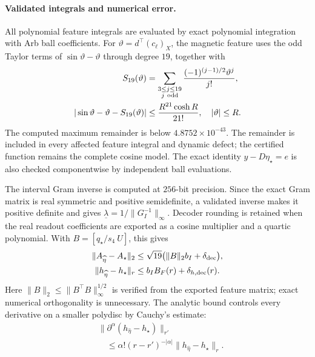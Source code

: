 \paragraph{Validated integrals and numerical error.}
All polynomial feature integrals are evaluated by exact polynomial
integration with Arb ball coefficients. For $\vartheta=d^\top(c_\ell)_X$,
the magnetic feature uses the odd Taylor terms of
$\sin\vartheta-\vartheta$ through degree $19$, together with
\begin{equation}
 \begin{aligned}
 S_{19}(\vartheta)&=
 \sum_{\substack{3\leq j\leq19\\j\ {\rm odd}}}
       \frac{(-1)^{(j-1)/2}\vartheta^j}{j!},\\
 |\sin\vartheta-\vartheta-S_{19}(\vartheta)|
 &\leq\frac{R^{21}\cosh R}{21!},\quad |\vartheta|\leq R .
 \end{aligned}
 \label{eq:integral-sine-remainder}
\end{equation}
The computed maximum remainder is below $4.8752\times10^{-43}$.
The remainder is included in every affected feature integral and dynamic
defect; the certified function remains the complete cosine model.
The exact identity $y-D\eta_\star=e$ is also checked componentwise by
independent ball evaluations.

The interval Gram inverse is computed at $256$-bit precision.
Since the exact Gram matrix is real symmetric and positive semidefinite,
a validated inverse makes it positive definite and gives
$\underline\lambda=1/\|G_I^{-1}\|_\infty$.
Decoder rounding is retained when the real readout coefficients are
exported as a cosine multiplier and a quartic polynomial.
With $B=[q_\star/s_4\ U]$, this gives
\begin{equation}
 \begin{aligned}
 \|A_{\widehat\eta}-A_\star\|_2
 &\leq\sqrt{19}\bigl(\|B\|_2b_I+\delta_{\rm dec}\bigr),\\
 \|h_{\widehat\eta}-h_\star\|_r
 &\leq b_I B_F(r)+\delta_{h,\rm dec}(r).
 \end{aligned}
 \label{eq:integral-analytic-transfer}
\end{equation}
Here $\|B\|_2\leq\|B^\top B\|_\infty^{1/2}$ is verified from the
exported feature matrix; exact numerical orthogonality is unnecessary.
The analytic bound controls every derivative on a smaller polydisc by
Cauchy's estimate:
\[
 \begin{aligned}
 &\|\partial^\alpha(h_{\widehat\eta}-h_\star)\|_{r'}\\
 &\quad\leq\alpha!(r-r')^{-|\alpha|}
       \|h_{\widehat\eta}-h_\star\|_r .
 \end{aligned}
\]

